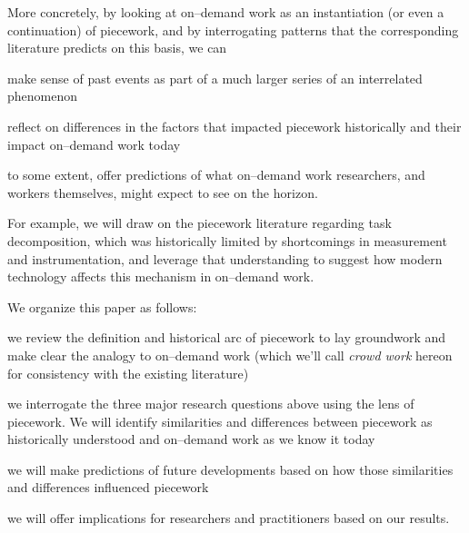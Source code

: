 \documentclass[trackingWork]{subfiles}
\begin{document}
More concretely, by looking at on--demand work as
an instantiation (or even a continuation) of piecework,
and by interrogating patterns that the corresponding literature predicts
on this basis, we can
\begin{numberlist}[itemjoin*={; and },itemjoin={;~}]
  \item make sense of past events as part of a much larger series of an interrelated phenomenon
  \item reflect on differences in the factors that impacted piecework historically and their impact on--demand work today
  \item to some extent, offer predictions of what on--demand work researchers,
        and workers themselves,
        might expect to see on the horizon.
\end{numberlist}
For example, we will draw on the piecework literature regarding task decomposition,
which was historically limited by shortcomings in measurement and instrumentation, and
leverage that understanding to suggest how modern technology affects this mechanism in on--demand work.


We organize this paper as follows:
\begin{numberlist}[itemjoin*={; and },itemjoin={;~}]
  \item we review the definition and historical arc of piecework
  to lay groundwork and make clear the analogy to on--demand work
  (which we'll call \textit{crowd work} hereon
  for consistency with the existing literature)
  \item we interrogate the three major research questions above using the lens of piecework. 
  We will identify similarities and differences between piecework as historically understood and
  on--demand work as we know it today
  \item we will make predictions of future developments based on how those similarities and differences influenced piecework
  \item we will offer implications for researchers and practitioners based on our results.
\end{numberlist}


\end{document}
